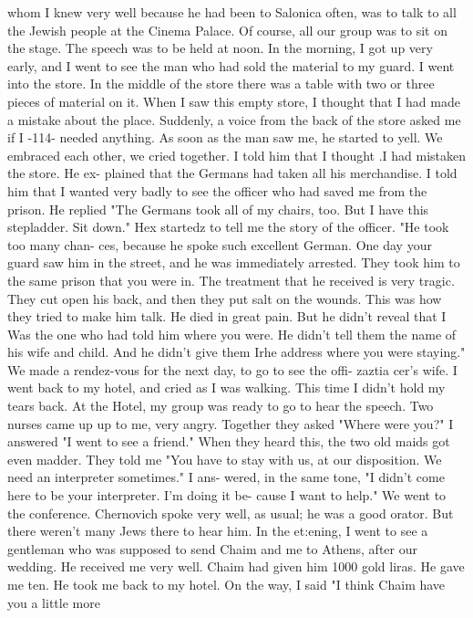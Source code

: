 whom I knew very well because he had been to Salonica often, was to talk to all the 
Jewish people at the Cinema Palace. Of course, all our group was to sit on the stage. 
The speech was to be held at noon. In the morning, I got up very early, and I went to 
see the man who had sold the material to my guard. 
I went into the store. In the middle of the store there was a table with two or 
three pieces of material on it. When I saw this empty store, I thought that I had made 
a mistake about the place. Suddenly, a voice from the back of the store asked me if I 
-114- 
needed anything. As soon as the man saw me, he started to yell. We embraced each 
other, we cried together. I told him that I thought .I had mistaken the store. He ex-
plained that the Germans had taken all his merchandise. 
I told him that I wanted very badly to see the officer who had saved me from the 
prison. He replied "The Germans took all of my chairs, too. But I have this stepladder. 
Sit down." Hex startedz to tell me the story of the officer. "He took too many chan-
ces, because he spoke such excellent German. One day your guard saw him in the street, 
and he was immediately arrested. They took him to the same prison that you were in. 
The treatment that he received is very tragic. They cut open his back, and then they 
put salt on the wounds. This was how they tried to make him talk. He died in great 
pain. But he didn't reveal that I Was the one who had told him where you were. He 
didn't tell them the name of his wife and child. And he didn't give them Irhe address 
where you were staying." We made a rendez-vous for the next day, to go to see the offi-
zaztia cer's wife. 
I went back to my hotel, and cried as I was walking. This time I didn't hold my 
tears back. At the Hotel, my group was ready to go to hear the speech. Two nurses came up 
up to me, very angry. Together they asked "Where were you?" I answered "I went to see 
a friend." When they heard this, the two old maids got even madder. They told me "You 
have to stay with us, at our disposition. We need an interpreter sometimes." I ans-
wered, in the same tone, "I didn't come here to be your interpreter. I'm doing it be-
cause I want to help." 
We went to the conference. Chernovich spoke very well, as usual; he was a good 
orator. But there weren't many Jews there to hear him. In the et:ening, I went to 
see a gentleman who was supposed to send Chaim and me to Athens, after our wedding. 
He received me very well. Chaim had given him 1000 gold liras. He gave me ten. He 
took me back to my hotel. On the way, I said "I think Chaim have you a little more 
